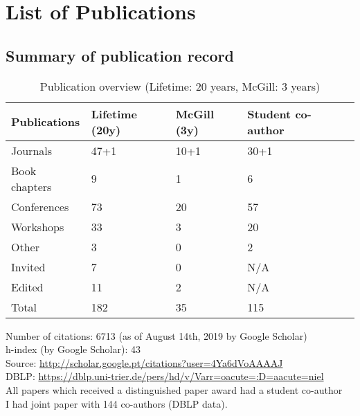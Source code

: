 \section{List of Publications}


\subsection{Summary of publication record}

\begin{table}[htb]
\begin{tabular}{@{}lllll@{}}
\toprule
\textbf{Publications} & \textbf{Lifetime} (20y) & \textbf{McGill} (3y) & \textbf{Student co-author} \\ \midrule
Journals & 47+1 & 10+1 & 30+1 \\ %
Book chapters & 9 & 1 & 6  \\ %
Conferences & 73 & 20 & 57  \\ %
Workshops & 33 & 3 & 20  \\ %
Other & 3 & 0 & 2  \\ %
Invited & 7 & 0 & N/A   \\ %
Edited & 11 & 2 & N/A \\ \midrule
Total & 182 & 35 & 115 \\ %
\bottomrule
\end{tabular}
\caption{Publication overview (Lifetime: 20 years, McGill: 3 years)}
\label{tab:publication-overview}
\end{table}


Number of citations: 6713 (as of August 14th, 2019 by Google Scholar) \\
h-index (by Google Scholar): 43 \\
Source: \url{http://scholar.google.pt/citations?user=4Ya6dVoAAAAJ}  \\
DBLP: \url{https://dblp.uni-trier.de/pers/hd/v/Varr=oacute=:D=aacute=niel}  \\
All papers which received a distinguished paper award had a student co-author \\
I had joint paper with 144 co-authors (DBLP data). \\

